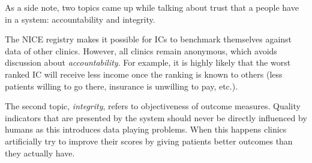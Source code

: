 As a side note, two topics came up while talking about trust that a people have in a system:  accountability and integrity.

The NICE registry makes it possible for ICs to benchmark themselves against data of other clinics.
However, all clinics remain anonymous, which avoids discussion about \emph{accountability}. 
For example, it is highly likely that the worst ranked IC will receive less income once the ranking is known to others (less patients willing to go there, insurance is unwilling to pay, etc.).

The second topic, \emph{integrity}, refers to objectiveness of outcome measures.
Quality indicators that are presented by the system should never be directly influenced by humans as this introduces data playing problems. 
When this happens clinics artificially try to improve their scores by giving patients better outcomes than they actually have.